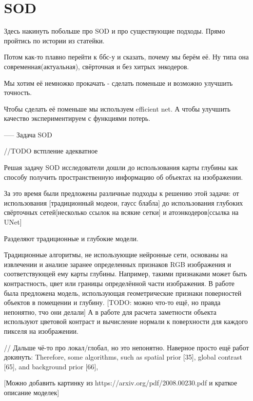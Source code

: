 \section{SOD}

Здесь накинуть побольше про SOD и про существующие подходы. Прямо пройтись по истории из статейки.

Потом как-то плавно перейти к ббс-у и сказать, почему мы берём её. Ну типа она современная(актуальная), свёрточная и без хитрых энкодеров.

Мы хотим её немножко прокачать - сделать поменьше и возможно улучшить точность.

Чтобы сделать её поменьше мы используем efficient net. А чтобы улучшить качество экспериментируем  с функциями потерь.



-----
Задача SOD 



//TODO встпление адекватное

Решая задачу SOD исследователи дошли до использования карты глубины как способу получить пространственную информацию об объектах на изображении.

За это время были предложены различные подходы к решению этой задачи: от использования [традиционный модеои, гаусс блабла] до использования глубоких свёрточных сетей[несколько ссылок на всякие сетки] и атоэнкодеров[ссылка на UNet]

Разделяют традиционные и глубокие модели.


Традиционные алгоритмы, не использующие нейронные сети, основаны на извлечении и анализе заранее определенных признаков RGB изображения и соответствующей ему карты глубины.
Например, такими признаками может быть контрастность, цвет или границы определённой части изображения. 
В работе \cite{Depth-really-Matters} была предложена модель, использующая геометрические признаки поверностей объектов в помещении и глубину. 
[TODO: можно что-то ещё, но правда непонятно, тчо они делали]
А в работе \cite{Depth-View-of-Saliency} для расчета заметности объекта используют цветовой контраст и вычисление нормали к поверхности\cite{Surface-Normal} для каждого пикселя на изображении.

// Дальше чё-то про локал/глобал, но это непонятно. Наверное просто ещё работ докинуть: Therefore, some algorithms, such as spatial
prior [35], global contrast [65], and background prior [66],

[Можно добавить картинку из https://arxiv.org/pdf/2008.00230.pdf и краткое описание моделек]


